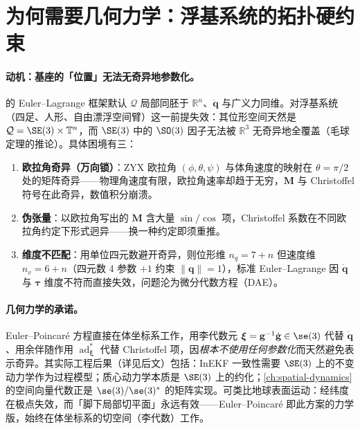 \section{为何需要几何力学：浮基系统的拓扑硬约束}
\label{sec:gm-why-geom}

\paragraph{动机：基座的「位置」无法无奇异地参数化。}
 的 Euler--Lagrange 框架默认 $\mathcal Q$ 局部同胚于 $\mathbb R^n$、$\dot{\mathbf q}$ 与广义力同维。对浮基系统（四足、人形、自由漂浮空间臂）这一前提失效：其位形空间天然是 $\mathcal Q=\SE(3)\times\mathbb T^n$，而 $\SE(3)$ 中的 $\SO(3)$ 因子无法被 $\mathbb R^3$ 无奇异地全覆盖（毛球定理的推论）。具体困境有三：

\begin{enumerate}
  \item \textbf{欧拉角奇异（万向锁）}：ZYX 欧拉角 $(\phi,\theta,\psi)$ 与体角速度的映射在 $\theta=\pi/2$ 处的矩阵奇异——物理角速度有限，欧拉角速率却趋于无穷，$\mathbf M$ 与 Christoffel 符号在此奇异，数值积分崩溃。
  \item \textbf{伪张量}：以欧拉角写出的 $\mathbf M$ 含大量 $\sin/\cos$ 项，Christoffel 系数在不同欧拉角约定下形式迥异——换一种约定即须重推。
  \item \textbf{维度不匹配}：用单位四元数避开奇异，则位形维 $n_q=7+n$ 但速度维 $n_v=6+n$（四元数 4 参数 $+1$ 约束 $\|\mathbf q\|=1$），标准 Euler--Lagrange 因 $\dot{\mathbf q}$ 与 $\boldsymbol\tau$ 维度不符而直接失效，问题沦为微分代数方程（DAE）。
\end{enumerate}

\paragraph{几何力学的承诺。}
Euler--Poincaré 方程直接在体坐标系工作，用李代数元 $\boldsymbol\xi=\mathbf g^{-1}\dot{\mathbf g}\in\se(3)$ 代替 $\dot{\mathbf q}$、用余伴随作用 $\operatorname{ad}^*_{\boldsymbol\xi}$ 代替 Christoffel 项，因\emph{根本不使用任何参数化}而天然避免表示奇异。其实际工程后果（详见后文）包括：InEKF 一致性需要 $\SE(3)$ 上的不变动力学作为过程模型\cite{barrau2017invariant}；质心动力学本质是 $\SE(3)$ 上的约化\cite{orin2013centroidal}；\cref{ch:spatial-dynamics} 的空间向量代数正是 $\se(3)/\se(3)^*$ 的矩阵实现。可类比地球表面运动：经纬度在极点失效，而「脚下局部切平面」永远有效——Euler--Poincaré 即此方案的力学版，始终在体坐标系的切空间（李代数）工作。

